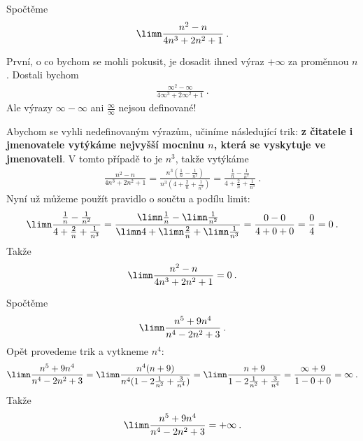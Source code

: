 \begin{example}
    Spočtěme 
    \begin{align}
        \limn \frac{n^2-n}{4n^3 + 2n^2 + 1} \:.
    \end{align}

    První, o co bychom se mohli pokusit, je dosadit ihned výraz $+\infty$ za proměnnou $n$. Dostali bychom
    \begin{align}
        \frac{\infty^2 - \infty}{4 \infty^3 + 2 \infty^2 + 1} \:.
    \end{align}
    Ale výrazy $\infty - \infty$ ani $\frac{\infty}{\infty}$ nejsou definované!

    Abychom se vyhli nedefinovaným výrazům, učiníme následující trik: \textbf{z čitatele i jmenovatele vytýkáme nejvyšší mocninu $n$, která se vyskytuje ve jmenovateli}. V tomto případě to je $n^3$, takže vytýkáme
    \begin{align}
        \frac{n^2-n}{4n^3 + 2n^2 + 1} = \frac{n^3 (\frac{1}{n} - \frac{1}{n^2})}{n^3 (4 + \frac{2}{n} + \frac{1}{n^3})} = \frac{\frac{1}{n} - \frac{1}{n^2}}{4 + \frac{2}{n} + \frac{1}{n^3}}\:.
    \end{align}
    Nyní už můžeme použít pravidlo o součtu a podílu limit:
    \begin{align}
        \limn \frac{\frac{1}{n} - \frac{1}{n^2}}{4 + \frac{2}{n} + \frac{1}{n^3}}
        = \frac{\limn \frac{1}{n} - \limn \frac{1}{n^2}}{\limn 4 + \limn \frac{2}{n} + \limn \frac{1}{n^3}} = \frac{0- 0}{4 + 0 + 0} = \frac{0}{4} = 0 \:.
    \end{align}
    Takže
    \begin{align}
        \limn \frac{n^2-n}{4n^3 + 2n^2 + 1} = 0\:.
    \end{align}
\end{example}

\begin{example}
    Spočtěme
    \begin{align}
        \limn \frac{n^5+ 9 n^4}{n^4 - 2n^2 + 3} \:.
    \end{align}
    Opět provedeme trik a vytkneme $n^4$:
    \begin{align}
        \limn \frac{n^5+ 9 n^4}{n^4 - 2n^2 + 3} =
        \limn \frac{n^4(n + 9)}{n^4(1 - 2 \frac{1}{n^2} + \frac{3}{n^4})} =
        \limn \frac{n + 9}{1 - 2 \frac{1}{n^2} + \frac{3}{n^4}}
        =
        \frac{\infty + 9}{1 - 0 + 0} = \infty \:.
    \end{align}
    Takže
    \begin{align}
        \limn \frac{n^5+ 9 n^4}{n^4 - 2n^2 + 3} = + \infty \:.
    \end{align}
\end{example}

